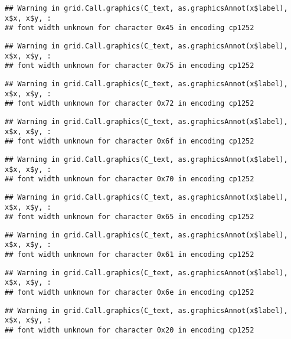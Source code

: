 \documentclass[
]{article}
\begin{document}
\begin{verbatim}
## Warning in grid.Call.graphics(C_text, as.graphicsAnnot(x$label), x$x, x$y, :
## font width unknown for character 0x45 in encoding cp1252
\end{verbatim}

\begin{verbatim}
## Warning in grid.Call.graphics(C_text, as.graphicsAnnot(x$label), x$x, x$y, :
## font width unknown for character 0x75 in encoding cp1252
\end{verbatim}

\begin{verbatim}
## Warning in grid.Call.graphics(C_text, as.graphicsAnnot(x$label), x$x, x$y, :
## font width unknown for character 0x72 in encoding cp1252
\end{verbatim}

\begin{verbatim}
## Warning in grid.Call.graphics(C_text, as.graphicsAnnot(x$label), x$x, x$y, :
## font width unknown for character 0x6f in encoding cp1252
\end{verbatim}

\begin{verbatim}
## Warning in grid.Call.graphics(C_text, as.graphicsAnnot(x$label), x$x, x$y, :
## font width unknown for character 0x70 in encoding cp1252
\end{verbatim}

\begin{verbatim}
## Warning in grid.Call.graphics(C_text, as.graphicsAnnot(x$label), x$x, x$y, :
## font width unknown for character 0x65 in encoding cp1252
\end{verbatim}

\begin{verbatim}
## Warning in grid.Call.graphics(C_text, as.graphicsAnnot(x$label), x$x, x$y, :
## font width unknown for character 0x61 in encoding cp1252
\end{verbatim}

\begin{verbatim}
## Warning in grid.Call.graphics(C_text, as.graphicsAnnot(x$label), x$x, x$y, :
## font width unknown for character 0x6e in encoding cp1252
\end{verbatim}

\begin{verbatim}
## Warning in grid.Call.graphics(C_text, as.graphicsAnnot(x$label), x$x, x$y, :
## font width unknown for character 0x20 in encoding cp1252
\end{verbatim}
\end{document}
